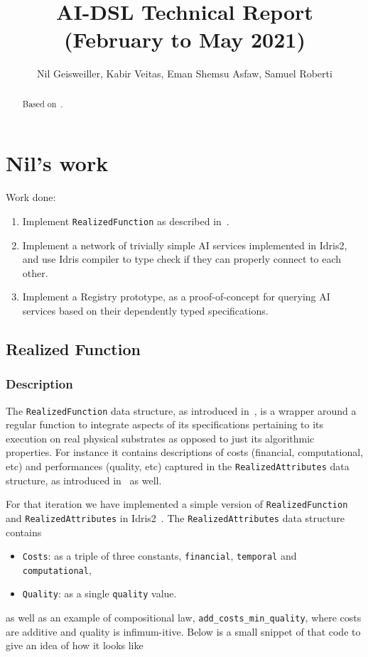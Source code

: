 \documentclass[]{report}
\begin{document}
\title{AI-DSL Technical Report (February to May 2021)}
\author{Nil Geisweiller, Kabir Veitas, Eman Shemsu Asfaw, Samuel Roberti}
\maketitle

\begin{abstract}
Based on~\cite{GoertzelGeisweillerBlog}.
\end{abstract}

\tableofcontents

\chapter{Nil's work}

Work done:
\begin{enumerate}
\item Implement \texttt{RealizedFunction} as described
  in~\cite{GoertzelGeisweillerBlog}.
\item Implement a network of trivially simple AI services implemented
  in Idris2, and use Idris compiler to type check if they can properly
  connect to each other.
\item Implement a Registry prototype, as a proof-of-concept for
  querying AI services based on their dependently typed
  specifications.
\end{enumerate}

\section{Realized Function}
\label{realized_function}

\subsection{Description}

The \texttt{RealizedFunction} data structure, as introduced
in~\cite{GoertzelGeisweillerBlog}, is a wrapper around a regular
function to integrate aspects of its specifications pertaining to its
execution on real physical substrates as opposed to just its
algorithmic properties.  For instance it contains descriptions of
costs (financial, computational, etc) and performances (quality, etc)
captured in the \texttt{RealizedAttributes} data structure, as
introduced in~\cite{GoertzelGeisweillerBlog} as well.

For that iteration we have implemented a simple version of
\texttt{RealizedFunction} and \texttt{RealizedAttributes} in
Idris2~\cite{Idris}.  The \texttt{RealizedAttributes} data structure
contains
\begin{itemize}
\item \texttt{Costs}: as a triple of three constants,
  \texttt{financial}, \texttt{temporal} and \texttt{computational},
\item \texttt{Quality}: as a single \texttt{quality} value.
\end{itemize}
as well as an example of compositional law,
\texttt{add\_costs\_min\_quality}, where costs are additive and
quality is infimum-itive.  Below is a small snippet of that code to
give an idea of how it looks like
\end{document}

